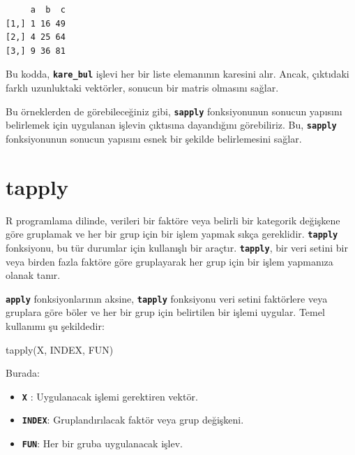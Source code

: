 \documentclass[
  letterpaper,
  DIV=11,
  numbers=noendperiod]{scrreprt}
\newenvironment{Shaded}{\begin{snugshade}}{\end{snugshade}}
\newcommand{\FunctionTok}[1]{\textcolor[rgb]{0.28,0.35,0.67}{#1}}
\newcommand{\NormalTok}[1]{\textcolor[rgb]{0.00,0.23,0.31}{#1}}
\begin{document}
\begin{verbatim}
     a  b  c
[1,] 1 16 49
[2,] 4 25 64
[3,] 9 36 81
\end{verbatim}

Bu kodda, \textbf{\texttt{kare\_bul}} işlevi her bir liste elemanının
karesini alır. Ancak, çıktıdaki farklı uzunluktaki vektörler, sonucun
bir matris olmasını sağlar.

Bu örneklerden de görebileceğiniz gibi, \textbf{\texttt{sapply}}
fonksiyonunun sonucun yapısını belirlemek için uygulanan işlevin
çıktısına dayandığını görebiliriz. Bu, \textbf{\texttt{sapply}}
fonksiyonunun sonucun yapısını esnek bir şekilde belirlemesini sağlar.

\section{tapply}\label{tapply}

R programlama dilinde, verileri bir faktöre veya belirli bir kategorik
değişkene göre gruplamak ve her bir grup için bir işlem yapmak sıkça
gereklidir. \textbf{\texttt{tapply}} fonksiyonu, bu tür durumlar için
kullanışlı bir araçtır. \textbf{\texttt{tapply}}, bir veri setini bir
veya birden fazla faktöre göre gruplayarak her grup için bir işlem
yapmanıza olanak tanır.

\textbf{\texttt{apply}} fonksiyonlarının aksine,
\textbf{\texttt{tapply}} fonksiyonu veri setini faktörlere veya gruplara
göre böler ve her bir grup için belirtilen bir işlemi uygular. Temel
kullanımı şu şekildedir:

\begin{Shaded}
\begin{Highlighting}[]
\FunctionTok{tapply}\NormalTok{(X, INDEX, FUN)}
\end{Highlighting}
\end{Shaded}

Burada:

\begin{itemize}
\item
  \textbf{\texttt{X}} : Uygulanacak işlemi gerektiren vektör.
\item
  \textbf{\texttt{INDEX}}: Gruplandırılacak faktör veya grup değişkeni.
\item
  \textbf{\texttt{FUN}}: Her bir gruba uygulanacak işlev.
\end{itemize}
\end{document}
